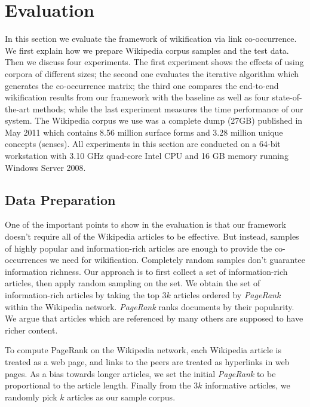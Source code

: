 \section{Evaluation}
\label{sec:eval}

In this section we evaluate the framework of
wikification via link co-occurrence.
We first explain how we prepare Wikipedia corpus samples and the test data.
Then we discuss four experiments. The first experiment shows
the effects of using corpora of different sizes; the second one evaluates
the iterative algorithm which generates the co-occurrence
matrix; the third one compares the end-to-end wikification results from
our framework with the baseline as well as four state-of-the-art methods;
while the last experiment measures the time performance of our system.
The Wikipedia corpus we use was a complete dump \cite{wikipedia} (27GB)
published in May 2011 which contains 8.56 million surface forms and
3.28 million unique concepts (senses). All experiments in this section
are conducted on a 64-bit workstation with 3.10 GHz quad-core Intel CPU
and 16 GB memory running Windows Server 2008.


\subsection{Data Preparation}
\label{sec:testdata}
One of the important points to show in the evaluation is that
our framework doesn't require all of the Wikipedia articles to be
effective. But instead, samples of highly popular and information-rich
articles are enough to provide the co-occurrences we need for wikification.
Completely random samples don't guarantee information richness.
Our approach is to first collect a set of information-rich articles,
then apply random sampling on the set.
We obtain the set of information-rich articles by taking the top $3k$ articles
ordered by \emph{PageRank}\cite{Brin1998} within the Wikipedia network.
\emph{PageRank} ranks documents by their popularity.
We argue that articles which are referenced by many others are supposed
to have richer content.

To compute PageRank on the Wikipedia network,
each Wikipedia article is treated as a web page, and links to the peers
are treated as hyperlinks in web pages.
As a bias towards longer articles, we set the initial \emph{PageRank}
to be proportional to the article length. Finally from the $3k$ informative articles, we randomly pick $k$ articles as
our sample corpus.

